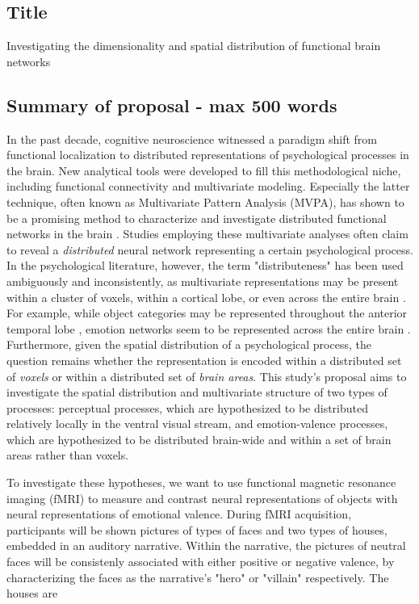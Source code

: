 \documentclass[12pt,a4paper]{article}
\begin{document}
\subsection{Title}
Investigating the dimensionality and spatial distribution of functional brain networks 

\subsection{Summary of proposal \textmd{- max 500 words}}
In the past decade, cognitive neuroscience witnessed a paradigm shift from functional localization to distributed representations of psychological processes in the brain. New analytical tools were developed to fill this methodological niche, including functional connectivity and multivariate modeling. Especially the latter technique, often known as Multivariate Pattern Analysis (MVPA), has shown to be a promising method to characterize and investigate distributed functional networks in the brain . Studies employing these multivariate analyses often claim to reveal a \emph{distributed} neural network representing a certain psychological process. In the psychological literature, however, the term "distributeness" has been used ambiguously and inconsistently, as multivariate representations may be present within a cluster of voxels, within a cortical lobe, or even across the entire brain \citep{coutanche2013}. For example, while object categories may be represented throughout the anterior temporal lobe \citep{haxby2001}, emotion networks seem to be represented across the entire brain \citep{lindquist2012}. Furthermore, given the spatial distribution of a psychological process, the question remains whether the representation is encoded within a distributed set of \emph{voxels} or within a distributed set of \emph{brain areas}. This study's proposal aims to investigate the spatial distribution and multivariate structure of two types of processes: perceptual processes, which are hypothesized to be distributed relatively locally in the ventral visual stream, and emotion-valence processes, which are hypothesized to be distributed brain-wide and within a set of brain areas rather than voxels. 

To investigate these hypotheses, we want to use functional magnetic resonance imaging (fMRI) to measure and contrast neural representations of objects with neural representations of emotional valence. During fMRI acquisition, participants will be shown pictures of types of faces and two types of houses, embedded in an auditory narrative. Within the narrative, the pictures of neutral faces will be consistenly associated with either positive or negative valence, by characterizing the faces as the narrative's "hero" or "villain" respectively. The houses are     
\end{document}
